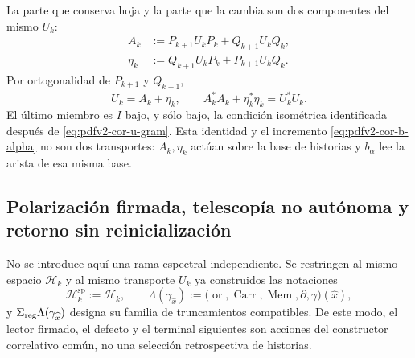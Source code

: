 La parte que conserva hoja y la parte que la cambia son dos componentes del
mismo \(U_k\):
\begin{align}
 A_k&:=P_{k+1}U_kP_k+Q_{k+1}U_kQ_k,
 \label{eq:pdfv2-cor-a-comun}\\
 \eta_k&:=Q_{k+1}U_kP_k+P_{k+1}U_kQ_k.
 \label{eq:pdfv2-cor-eta-comun}
\end{align}
Por ortogonalidad de \(P_{k+1}\) y \(Q_{k+1}\),
\begin{equation}
\label{eq:pdfv2-cor-balance-hojas}
 U_k=A_k+\eta_k,\qquad
 A_k^*A_k+\eta_k^*\eta_k=U_k^*U_k.
\end{equation}
El último miembro es \(I\) bajo, y sólo bajo, la condición isométrica
identificada después de \eqref{eq:pdfv2-cor-u-gram}.
Esta identidad y el incremento \eqref{eq:pdfv2-cor-b-alpha} no son dos
transportes: \(A_k,\eta_k\) actúan sobre la base de historias y
\(b_\alpha\) lee la arista de esa misma base.

\subsection{Polarización firmada, telescopía no autónoma y retorno sin reinicialización}
No se introduce aquí una rama espectral independiente. Se restringen al
mismo espacio \(\mathscr H_k\) y al mismo transporte \(U_k\) ya construidos
las notaciones
\[
 \mathcal H_k^{\mathrm{sp}}:=\mathscr H_k,
 \qquad
 \Lambda(\gamma_{\widehat x})
 :=\bigl(\operatorname{or},\operatorname{Carr},\operatorname{Mem},
          \partial,\gamma\bigr)(\widehat x),
\]
y \(\Sigma_{\rm reg}\Lambda(\gamma_{\widehat x})\) designa su familia de
truncamientos compatibles. De este modo, el lector firmado, el defecto y el
terminal siguientes son acciones del constructor correlativo común, no una
selección retrospectiva de historias.
\begingroup
  \let\section\subsection
  
  
\endgroup

